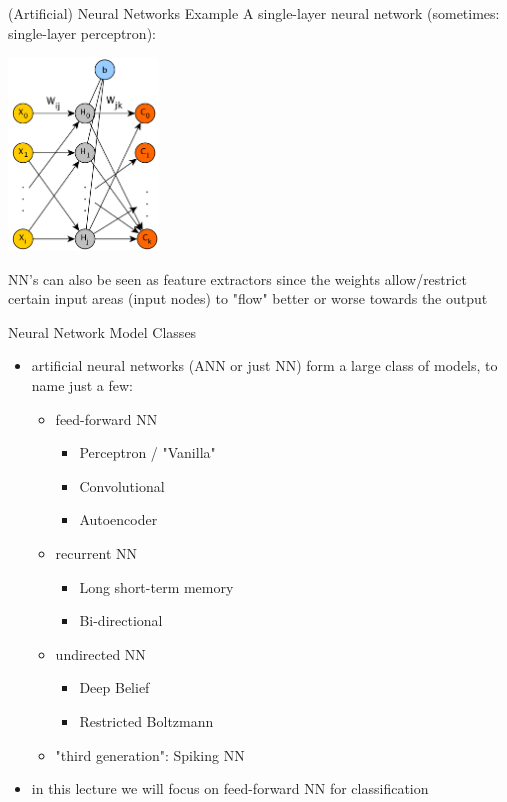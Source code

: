 \documentclass{beamer}
\begin{document}
\begin{frame}{(Artificial) Neural Networks Example}
A single-layer neural network (sometimes: single-layer perceptron):
\begin{center}
\includegraphics[width=0.3\textwidth]{basic_ff_nn}
\end{center}
NN's can also be seen as feature extractors since the weights allow/restrict certain input areas (input nodes) to "flow" better or worse towards the output
\end{frame}

\begin{frame}{Neural Network Model Classes}
\begin{itemize}
\item artificial neural networks (ANN or just NN) form a large class of models, to name just a few:
  \begin{itemize}
\item feed-forward NN
    \begin{itemize}
	\item Perceptron / "Vanilla"
    \item Convolutional
    \item Autoencoder
    \end{itemize}
\item recurrent NN
  \begin{itemize}
  \item Long short-term memory
  \item Bi-directional
  \end{itemize}
\item undirected NN
  \begin{itemize}
  \item Deep Belief
  \item Restricted Boltzmann
  \end{itemize}
\item "third generation": Spiking NN
  \end{itemize}
\item in this lecture we will focus on feed-forward NN for classification
\end{itemize}  
\end{frame}
\end{document}
